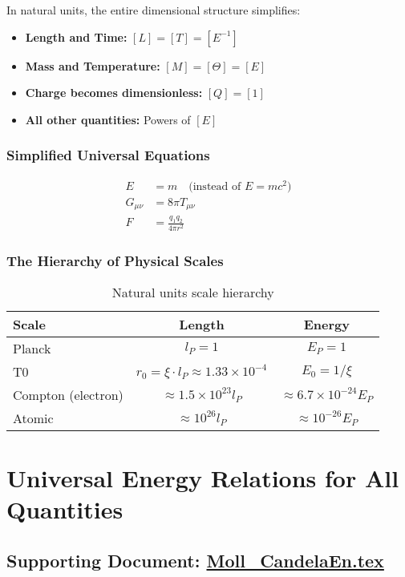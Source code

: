 \documentclass[12pt,a4paper]{report}
\begin{document}
	In natural units, the entire dimensional structure simplifies:
	\begin{itemize}
		\item \textbf{Length and Time:} $[L] = [T] = [E^{-1}]$
		\item \textbf{Mass and Temperature:} $[M] = [\Theta] = [E]$
		\item \textbf{Charge becomes dimensionless:} $[Q] = [1]$
		\item \textbf{All other quantities:} Powers of $[E]$
	\end{itemize}
	
	\subsubsection{Simplified Universal Equations}
	\begin{align}
		E &= m \quad \text{(instead of } E = mc^2\text{)} \\
		G_{\mu\nu} &= 8\pi T_{\mu\nu} \\
		F &= \frac{q_1 q_2}{4\pi r^2}
	\end{align}
	
	\subsubsection{The Hierarchy of Physical Scales}
	\begin{table}[H]
		\centering
		\begin{tabular}{lcc}
			\toprule
			\textbf{Scale} & \textbf{Length} & \textbf{Energy} \\
			\midrule
			Planck & $l_P = 1$ & $E_P = 1$ \\
			T0 & $r_0 = \xi \cdot l_P \approx 1.33 \times 10^{-4}$ & $E_0 = 1/\xi$ \\
			Compton (electron) & $\approx 1.5 \times 10^{23} l_P$ & $\approx 6.7 \times 10^{-24} E_P$ \\
			Atomic & $\approx 10^{26} l_P$ & $\approx 10^{-26} E_P$ \\
			\bottomrule
		\end{tabular}
		\caption{Natural units scale hierarchy}
		\label{tab:scale-hierarchy}
	\end{table}
	
	\section{Universal Energy Relations for All Quantities}
	\subsection{Supporting Document: \href{https://github.com/jpascher/T0-Time-Mass-Duality/tree/main/2/pdf/Moll_CandelaEn.pdf}{Moll\_CandelaEn.tex}}
	
\end{document}
